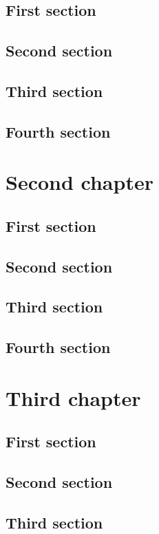 \documentclass{researchbook}
\theoremstyle{plain}
\theoremstyle{definition}
\theoremstyle{remark}
\begin{document}
\section{First section}\lipsum
\section{Second section}\lipsum
\section{Third section}\lipsum
\section{Fourth section}\lipsum


\chapter{Second chapter}

\section{First section}\lipsum
\section{Second section}\lipsum
\section{Third section}\lipsum
\section{Fourth section}\lipsum


\chapter{Third chapter}

\section{First section}\lipsum
\section{Second section}\lipsum
\section{Third section}\lipsum
\end{document}
